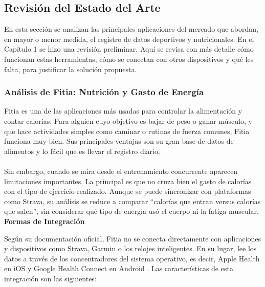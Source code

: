 \subsection{Revisión del Estado del Arte}
En esta sección se analizan las principales aplicaciones del mercado que abordan, en mayor o menor medida, el registro de datos deportivos y nutricionales. En el Capítulo 1 se hizo una revisión preliminar. Aquí se revisa con más detalle cómo funcionan estas herramientas, cómo se conectan con otros dispositivos y qué les falta, para justificar la solución propuesta.

\subsubsection{Análisis de Fitia: Nutrición y Gasto de Energía}
Fitia es una de las aplicaciones más usadas para controlar la alimentación y contar calorías. Para alguien cuyo objetivo es bajar de peso o ganar músculo, y que hace actividades simples como caminar o rutinas de fuerza comunes, Fitia funciona muy bien. Sus principales ventajas son su gran base de datos de alimentos y lo fácil que es llevar el registro diario.
\\\\
Sin embargo, cuando se mira desde el entrenamiento concurrente aparecen limitaciones importantes. La principal es que no cruza bien el gasto de calorías con el tipo de ejercicio realizado. Aunque se puede sincronizar con plataformas como Strava, su análisis se reduce a comparar ``calorías que entran versus calorías que salen'', sin considerar qué tipo de energía usó el cuerpo ni la fatiga muscular.
\newpage
\textbf{Formas de Integración}

Según su documentación oficial, Fitia no se conecta directamente con aplicaciones y dispositivos como Strava, Garmin o los relojes inteligentes. En su lugar, lee los datos a través de los concentradores del sistema operativo, es decir, Apple Health en iOS y Google Health Connect en Android \citep{fitia_sync_health, fitia_import_apple}. Las características de esta integración son las siguientes:

